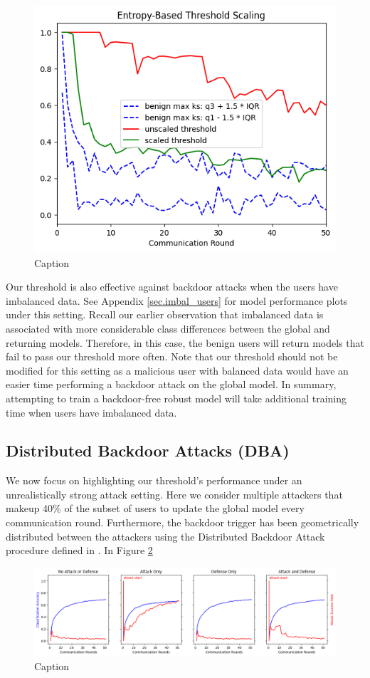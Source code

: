 \documentclass{article} %
\begin{document}
\begin{figure}[H]
    \centering
    \includegraphics[width=.5\textwidth]{01_trusted/centralized/alpha10000--alpha_val1/visuals/scaling--n_malicious1--m_start1--d_rounds50.png}
    \caption{Caption}
    \label{fig:centralized--alpha10000--alpha_val1--scaling--d_rounds50.png}
\end{figure}

Our threshold is also effective against backdoor attacks when the users have imbalanced data. See Appendix \ref{sec.imbal_users} for model performance plots under this setting. Recall our earlier observation that imbalanced data is associated with more considerable class differences between the global and returning models. Therefore, in this case, the benign users will return models that fail to pass our threshold more often. Note that our threshold should not be modified for this setting as a malicious user with balanced data would have an easier time performing a backdoor attack on the global model. In summary, attempting to train a backdoor-free robust model will take additional training time when users have imbalanced data.

\subsection{Distributed Backdoor Attacks (DBA)}

We now focus on highlighting our threshold's performance under an unrealistically strong attack setting. Here we consider multiple attackers that makeup 40\% of the subset of users to update the global model every communication round. Furthermore, the backdoor trigger has been geometrically distributed between the attackers using the Distributed Backdoor Attack procedure defined in \cite{dba}. In Figure \ref{fig:distributed--alpha10000--alpha_val10000--accuracy}

\begin{figure}[H]
    \centering
    \includegraphics[width=\textwidth]{01_trusted/distributed/alpha10000--alpha_val10000/visuals/accuracy--n_malicious4--m_start1.png}
    \caption{Caption}
    \label{fig:distributed--alpha10000--alpha_val10000--accuracy}
\end{figure}
\end{document}
